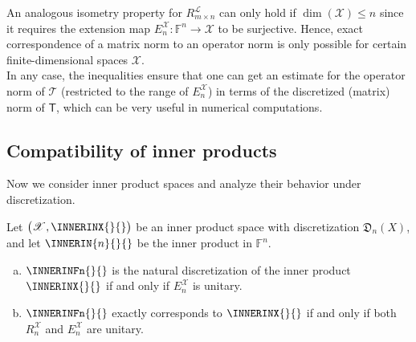 \documentclass[a4paper]{paper}
\newcommand*{\SPC}[1]{{\ensuremath{\mathscr{#1}}}}
\newcommand*{\SPCL}{\SPC{L}}
\newcommand*{\SPCX}{\SPC{X}}
\newcommand*{\FIELD}{{\ensuremath{\mathbb{F}}}}
\newcommand*{\Fn}{{\ensuremath{\FIELD^n}}}
\newcommand*{\OP}[1]{{\ensuremath{\mathcal{#1}}}}
\newcommand*{\OPT}{\OP{T}}
\newcommand{\DISCOP}[1]{{\ensuremath{\mathsf{#1}}}}
\newcommand*{\DISCOPT}{\DISCOP{T}}
\newcommand*{\EXT}[2]{\ensuremath{E_{#1}^{#2}}}
\newcommand*{\REST}[2]{\ensuremath{R_{#1}^{#2}}}
\newcommand*{\RnX}{{\ensuremath{\REST{n}{\SPC{X}}}}}
\newcommand*{\EnX}{{\ensuremath{\EXT{n}{\SPC{X}}}}}
\newcommand*{\DISCR}[2]{{\ensuremath{\mathfrak{D}_{#1}(#2)}}}
\newcommand*{\DISCRnX}{\DISCR{n}{X}}
\DeclareMathOperator{\DIM}{{dim}}
\begin{document}
\begin{remark}
 \label{remark:prop:norm:op_norm_corresp}
 An analogous isometry property for $\REST{m\times n}{\SPCL}$ can only hold if $\DIM(\SPCX) \leq n$ 
 since it requires the extension map $\EnX \colon \Fn \to \SPCX$ to be surjective. Hence, exact correspondence 
 of a matrix norm to an operator norm is only possible for certain finite-dimensional spaces $\SPCX$.\\
 In any case, the inequalities ensure that one can get an estimate for the operator norm of $\OPT$ (restricted to the 
 range of $\EnX$) in terms of the discretized (matrix) norm of $\DISCOPT$, which can be very useful in numerical 
 computations.
\end{remark}



\subsection{Compatibility of inner products}
\label{subsec:prop:inner}

Now we consider inner product spaces and analyze their behavior under discretization.


\begin{lemma}
 \label{lemma:prop:inner:natural_corresp}
 Let $\big( \SPCX, \INNERINX{}{} \big)$ be an inner product space with discretization $\DISCRnX$, and 
 let $\INNERIN{n}{}{}$ be the inner product in $\Fn$.
 \begin{enumerate}[(a)]
  \item \label{lemma:prop:inner:natural_corresp:a_natural}
  $\INNERINFn{}{}$ is the natural discretization of the inner product $\INNERINX{}{}$ if and 
  only if $\EnX$ is unitary.
  
  \item \label{lemma:prop:inner:natural_corresp:b_corresp}
  $\INNERINFn{}{}$ exactly corresponds to $\INNERINX{}{}$ if and only if both $\RnX$ and 
  $\EnX$ are unitary.
 \end{enumerate}
\end{lemma}
\vspace{1em}
\end{document}
